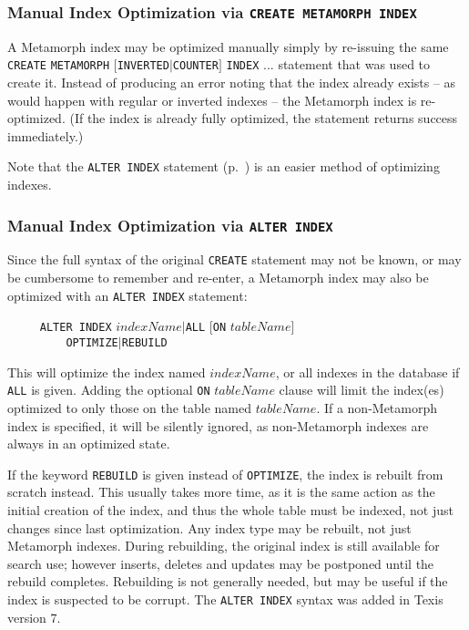 \subsubsection{Manual Index Optimization via {\tt CREATE METAMORPH INDEX}}

A Metamorph index may be optimized manually simply by re-issuing the
same \verb`CREATE` \verb`METAMORPH`
$[$\verb`INVERTED`$|$\verb`COUNTER`$]$ \verb`INDEX` $...$ statement
that was used to create it.  Instead of producing an error noting that
the index already exists -- as would happen with regular or inverted
indexes -- the Metamorph index is re-optimized.  (If the index is
already fully optimized, the statement returns success immediately.)

Note that the {\tt ALTER INDEX} statement (p.~\pageref{alterIndex}) is
an easier method of optimizing indexes.

\subsubsection{Manual Index Optimization via {\tt ALTER INDEX}}
\label{alterIndex}

  Since the full syntax of the original \verb`CREATE` statement may
not be known, or may be cumbersome to remember and re-enter, a
Metamorph index may also be optimized with an \verb`ALTER INDEX` statement:

\verb`     ALTER INDEX` $indexName$$|$\verb`ALL` [\verb`ON` $tableName$] \\
\verb`         OPTIMIZE`$|$\verb`REBUILD`

This will optimize the index named $indexName$, or all indexes in the
database if \verb`ALL` is given.  Adding the optional \verb`ON`
$tableName$ clause will limit the index(es) optimized to only those on
the table named $tableName$.  If a non-Metamorph index is specified,
it will be silently ignored, as non-Metamorph indexes are always
in an optimized state.

If the keyword \verb`REBUILD` is given instead of \verb`OPTIMIZE`, the
index is rebuilt from scratch instead.  This usually takes more time,
as it is the same action as the initial creation of the index, and
thus the whole table must be indexed, not just changes since last
optimization.  Any index type may be rebuilt, not just Metamorph
indexes.  During rebuilding, the original index is still available for
search use; however inserts, deletes and updates may be postponed
until the rebuild completes.  Rebuilding is not generally needed, but
may be useful if the index is suspected to be corrupt.  The
\verb`ALTER INDEX` syntax was added in Texis version 7.

